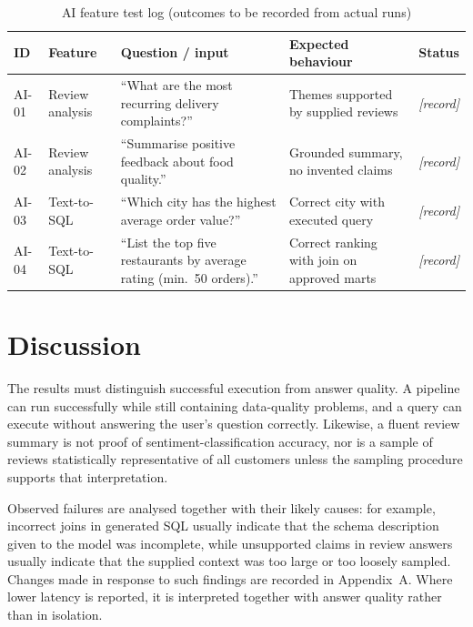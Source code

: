 \documentclass[12pt,a4paper]{report}
\newcommand{\ph}[1]{\textit{[#1]}}
\begin{document}
\begin{table}[htbp]
\centering
\caption{AI feature test log (outcomes to be recorded from actual runs)}
\label{tab:ai}
\small
\begin{tabular}{@{}p{1.2cm}p{2.4cm}p{4.4cm}p{3.2cm}p{2.0cm}@{}}
\toprule
\textbf{ID} & \textbf{Feature} & \textbf{Question / input} & \textbf{Expected behaviour} & \textbf{Status} \\
\midrule
AI-01 & Review analysis & ``What are the most recurring delivery complaints?'' & Themes supported by supplied reviews & \ph{record} \\
AI-02 & Review analysis & ``Summarise positive feedback about food quality.'' & Grounded summary, no invented claims & \ph{record} \\
AI-03 & Text-to-SQL & ``Which city has the highest average order value?'' & Correct city with executed query & \ph{record} \\
AI-04 & Text-to-SQL & ``List the top five restaurants by average rating (min.\ 50 orders).'' & Correct ranking with join on approved marts & \ph{record} \\
\bottomrule
\end{tabular}
\end{table}

\section{Discussion}
The results must distinguish successful execution from answer quality. A pipeline can run successfully while still containing data-quality problems, and a query can execute without answering the user's question correctly. Likewise, a fluent review summary is not proof of sentiment-classification accuracy, nor is a sample of reviews statistically representative of all customers unless the sampling procedure supports that interpretation.

Observed failures are analysed together with their likely causes: for example, incorrect joins in generated SQL usually indicate that the schema description given to the model was incomplete, while unsupported claims in review answers usually indicate that the supplied context was too large or too loosely sampled. Changes made in response to such findings are recorded in Appendix~A. Where lower latency is reported, it is interpreted together with answer quality rather than in isolation.
\end{document}

